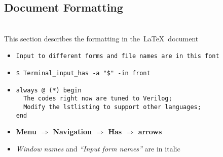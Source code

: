 
\subsection *{Document Formatting}
\label{subsec:doc_format}
\hrulefill \\
This section describes the formatting in the~\LaTeX~document
\begin{itemize}
\item \verb+Input to different forms and file names are in this font+ 
\item \verb+$ Terminal_input_has -a "$" -in front+ 
\item[] 
\begin{lstlisting}
always @ (*) begin
  The codes right now are tuned to Verilog;
  Modify the lstlisting to support other languages;
end
\end{lstlisting}
\item \textbf{Menu $\Rightarrow$ Navigation $\Rightarrow$ Has 
  $\Rightarrow$ arrows}
\item \textit{Window names} and \textit{``Input form names''} are in italic
\end{itemize}
\hrulefill



